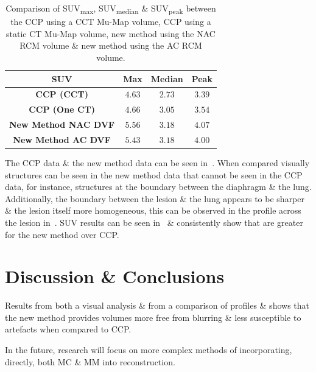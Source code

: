     \begin{table}
        \centering
        \captionsetup{singlelinecheck=false, justification=centering}
        \caption{Comparison of \gls{SUV}\textsubscript{max}, \gls{SUV}\textsubscript{median} \& \gls{SUV}\textsubscript{peak} between the \gls{CCP} using a \gls{CCT} \gls{Mu-Map} volume, \gls{CCP} using a static \gls{CT} \gls{Mu-Map} volume, new method using the \gls{NAC} \gls{RCM} volume \& new method using the \gls{AC} \gls{RCM} volume.}
        
        \resizebox*{0.75\linewidth}{!}
        {
            \begin{tabular}{||c|ccc||}
                \hline
                \textbf{\gls{SUV}} & \textbf{Max} & \textbf{Median} & \textbf{Peak} \\
                \hline
                \textbf{\gls{CCP} (\gls{CCT})}          & $4.63$ & $2.73$ & $3.39$ \\
                \textbf{\gls{CCP} (One \gls{CT})}       & $4.66$ & $3.05$ & $3.54$ \\
                \hline
                \textbf{New Method \gls{NAC} \gls{DVF}} & $5.56$ & $3.18$ & $4.07$ \\
                \textbf{New Method \gls{AC} \gls{DVF}}  & $5.43$ & $3.18$ & $4.00$ \\
                \hline
            \end{tabular}
        }
        \label{tab:suv}
    \end{table}
    
     The \gls{CCP} data \& the new method data can be seen in~. When compared visually structures can be seen in the new method data that cannot be seen in the \gls{CCP} data, for instance, structures at the boundary between the diaphragm \& the lung. Additionally, the boundary between the lesion \& the lung appears to be sharper \& the lesion itself more homogeneous, this can be observed in the profile across the lesion in~. \gls{SUV} results can be seen in~ \& consistently show that  are greater for the new method over \gls{CCP}.

\section{Discussion \& Conclusions} \label{sec:discussion_and_conclusions}
    Results from both a visual analysis \& from a comparison of profiles \&  shows that the new method provides volumes more free from blurring \& less susceptible to artefacts when compared to \gls{CCP}.
    
    In the future, research will focus on more complex methods of incorporating, directly, both \gls{MC}  \& \gls{MM} into reconstruction.